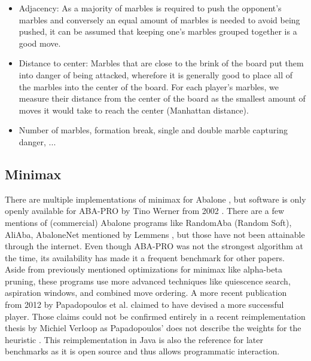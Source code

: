\begin{itemize}
    \item Adjacency: As a majority of marbles is required to push the opponent's marbles and conversely an equal amount of marbles is needed to avoid being pushed, it can be assumed that keeping one's marbles grouped together is a good move.
    \item Distance to center: Marbles that are close to the brink of the board put them into danger of being attacked, wherefore it is generally good to place all of the marbles into the center of the board. For each player's marbles, we measure their distance from the center of the board as the smallest amount of moves it would take to reach the center (Manhattan distance).
    \item Number of marbles, formation break, single and double marble capturing danger, ... \cite[p. 64]{papadopoulos_exploring_2012}
\end{itemize}

\subsection{Minimax}
There are multiple implementations of minimax for Abalone \cite{chorus_implementing_2009,lemmens_constructing_2005,ozcan_simple_2004-1,aichholzer_algorithmic_2002}, but software is only openly available for ABA-PRO by Tino Werner from 2002 \cite{aichholzer_oswin_2006}. There are a few mentions of (commercial) Abalone programs like RandomAba (Random Soft), AliAba, AbaloneNet mentioned by Lemmens \cite[p. 7]{lemmens_constructing_2005}, but those have not been attainable through the internet. Even though ABA-PRO was not the strongest algorithm at the time, its availability has made it a frequent benchmark for other papers. Aside from previously mentioned optimizations for minimax like alpha-beta pruning, these programs use more advanced techniques like quiescence search, aspiration windows, and combined move ordering. A more recent publication from 2012 by Papadopoulos et al. claimed to have devised a more successful player. \cite{papadopoulos_exploring_2012}  Those claims could not be confirmed entirely in a recent reimplementation thesis by Michiel Verloop as Papadopoulos' does not describe the weights for the heuristic \cite{verloop_critical_nodate}. This reimplementation in Java \cite{verloop_abaloneai_nodate} is also the reference for later benchmarks as it is open source \cite{verloop_abaloneai_nodate} and thus allows programmatic interaction.

